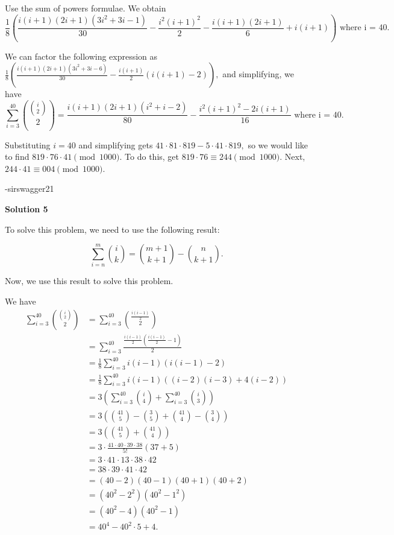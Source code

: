 \begin{enumerate}
 Use the sum of powers formulae. We obtain 
 \[\frac{1}{8}\left(\frac{i(i+1)(2i+1)(3i^2+3i-1)}{30} - \frac{i^2(i+1)^2}{2} - \frac{i(i+1)(2i+1)}{6} + i(i+1)\right) \text{ where i = 40.}\]

 We can factor the following expression as $\frac{1}{8}\left(\frac{i(i+1)(2i+1)(3i^2+3i-6)}{30} - \frac{i(i+1)}{2} (i(i+1)-2)\right),$ and simplifying, we have 
 \[\sum_{i=3}^{40} \binom{\binom{i}{2}}{2} = \frac{i(i+1)(2i+1)(i^2+i-2)}{80}-\frac{i^2(i+1)^2-2i(i+1)}{16} \text{ where i = 40.}\]

 Substituting $i=40$ and simplifying gets $41\cdot 81\cdot 819 - 5\cdot 41\cdot 819,$ so we would like to find $819\cdot 76\cdot 41 \pmod{1000}.$ To do this, get $819\cdot 76\equiv 244 \pmod{1000}.$ Next, $244\cdot 41 \equiv \boxed{004} \pmod{1000}.$

 -sirswagger21

 


 



\textbf{Solution 5}

To solve this problem, we need to use the following result:

 
 \[ \sum_{i=n}^m \binom{i}{k} = \binom{m+1}{k+1} - \binom{n}{k+1} . \]

 Now, we use this result to solve this problem.

 We have
 \begin{align*} \sum_{i=3}^{40} \binom{\binom{i}{2}}{2}  & = \sum_{i=3}^{40} \binom{\frac{i \left( i - 1 \right)}{2}}{2} \\ & = \sum_{i=3}^{40} \frac{\frac{i \left( i - 1 \right)}{2} \left( \frac{i \left( i - 1 \right)}{2}- 1 \right)}{2} \\ & = \frac{1}{8} \sum_{i=3}^{40}  i \left( i - 1 \right) \left( i \left( i - 1 \right) - 2 \right)  \\ & = \frac{1}{8} \sum_{i=3}^{40}  i \left( i - 1 \right)  \left( \left( i - 2 \right) \left( i - 3 \right) + 4 \left( i - 2 \right) \right)  \\ & = 3 \left( \sum_{i=3}^{40} \binom{i}{4} + \sum_{i=3}^{40} \binom{i}{3} \right) \\ & = 3 \left( \binom{41}{5} - \binom{3}{5} + \binom{41}{4} - \binom{3}{4} \right) \\ & = 3 \left( \binom{41}{5} + \binom{41}{4} \right) \\ & = 3 \cdot \frac{41 \cdot 40 \cdot 39 \cdot 38}{5!} \left( 37 + 5 \right) \\ & = 3 \cdot 41 \cdot 13 \cdot 38 \cdot 42 \\ & = 38 \cdot 39 \cdot 41 \cdot 42 \\ & = \left( 40 - 2 \right) \left( 40 - 1 \right) \left( 40 + 1 \right) \left( 40 + 2 \right) \\ & = \left( 40^2 - 2^2 \right) \left( 40^2 - 1^2 \right) \\ & = \left( 40^2 - 4 \right) \left( 40^2 - 1 \right) \\ & = 40^4 - 40^2 \cdot 5 + 4  . \end{align*}



\end{enumerate}
